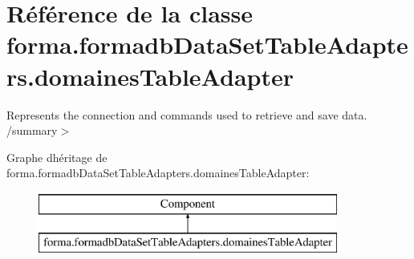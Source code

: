 \hypertarget{classforma_1_1formadb_data_set_table_adapters_1_1domaines_table_adapter}{}\section{Référence de la classe forma.\+formadb\+Data\+Set\+Table\+Adapters.\+domaines\+Table\+Adapter}
\label{classforma_1_1formadb_data_set_table_adapters_1_1domaines_table_adapter}


Represents the connection and commands used to retrieve and save data. /summary$>$  


Graphe d\textquotesingle{}héritage de forma.\+formadb\+Data\+Set\+Table\+Adapters.\+domaines\+Table\+Adapter\+:\begin{figure}[H]
\begin{center}
\leavevmode
\includegraphics[height=2.000000cm]{classforma_1_1formadb_data_set_table_adapters_1_1domaines_table_adapter}
\end{center}
\end{figure}
